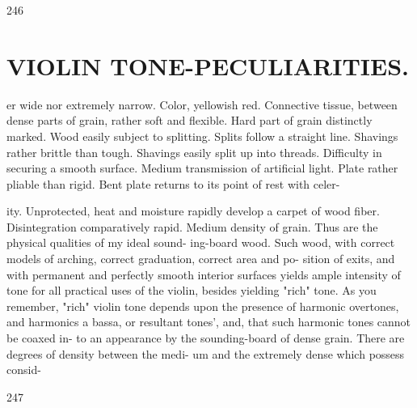 \documentclass{article}
\begin{document}
246

\section*{VIOLIN TONE-PECULIARITIES.}
er wide nor extremely narrow. Color, yellowish red. Connective tissue, between dense parts of grain, rather soft and flexible. Hard part of grain distinctly marked. Wood easily subject to splitting. Splits follow a straight line. Shavings rather brittle than tough. Shavings easily split up into threads. Difficulty in securing a smooth surface. Medium transmission of artificial light. Plate rather pliable than rigid. Bent plate returns to its point of rest with celer-

ity. Unprotected, heat and moisture rapidly develop a carpet of wood fiber. Disintegration comparatively rapid. Medium density of grain. Thus are the physical qualities of my ideal sound- ing-board wood. Such wood, with correct models of arching, correct graduation, correct area and po- sition of exits, and with permanent and perfectly smooth interior surfaces yields ample intensity of tone for all practical uses of the violin, besides yielding "rich" tone. As you remember, "rich" violin tone depends upon the presence of harmonic overtones, and harmonics a bassa, or resultant tones', and, that such harmonic tones cannot be coaxed in- to an appearance by the sounding-board of dense grain. There are degrees of density between the medi- um and the extremely dense which possess consid-

247
\end{document}
